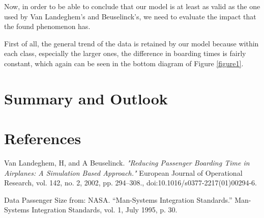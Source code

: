 \documentclass[11pt]{article}
\begin{document}
Now, in order to be able to conclude that our model is at least as valid as the one used by Van Landeghem's and Beuselinck's, we need to evaluate the impact that the found phenomenon has. 

First of all, the general trend of the data is retained by our model because within each class, especially the larger ones, the difference in boarding times is fairly constant, which again can be seen in the bottom diagram of Figure \ref{figure1}. 


\section{Summary and Outlook}

\section{References}
\begin{thebibliography}{9}
	Van Landeghem, H, and A Beuselinck. 
	\textit{"Reducing Passenger Boarding Time in Airplanes: A Simulation Based Approach."} 
	European Journal of Operational Research, vol. 142, no. 2, 2002, pp. 294–308.,
	doi:10.1016/s0377-2217(01)00294-6.
	
	Data Passenger Size from:  NASA. “Man-Systems Integration Standards.” Man-Systems Integration Standards, vol. 1, July 1995, p. 30.
\end{thebibliography}
\end{document}
